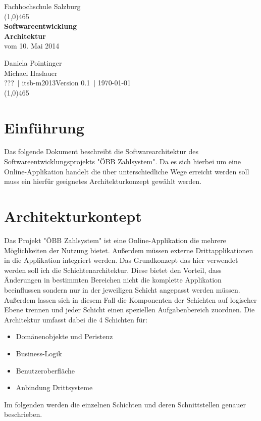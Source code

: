 \documentclass[a4paper,12pt]{article} %
\author{\theauthor\\\company}
\date{\thedate}
\title{\thetitle}
\def \theauthor  {Daniela Pointinger\\Michael Haslauer\\???}
\def \thedate    {\today}
\def \thetitle   {Softwareentwicklung\\Architektur}
\def \subtitle   {vom 10. Mai 2014}
\def \company    {Fachhochschule Salzburg}
\def \department {itsb-m2013}
\def \version    {0.1}
\begin{document}
\begin{titlepage}
\begin{center}
\Large\company\tiny\\
\textcolor{titlepagelinecolor}{\line(1,0){465}\\[1cm]}
\huge
\textbf{\thetitle}\\
\Large \subtitle\\[1cm]
\end{center}
\large
\theauthor\ $\mid$ \department\hfill Version \version\ $\mid$ \thedate\\[1cm]
\textcolor{titlepagelinecolor}{\line(1,0){465}\\[1cm]}
\end{titlepage}

\tableofcontents %

\newpage


\section{Einführung}
Das folgende Dokument beschreibt die Softwarearchitektur des Softwareentwicklungsprojekts "ÖBB Zahlsystem". Da es sich hierbei um eine Online-Applikation handelt die über unterschiedliche Wege erreicht werden soll muss ein hierfür geeignetes Architekturkonzept gewählt werden.

\section{Architekturkontept}
Das Projekt "ÖBB Zahlsystem" ist eine Online-Applikation die mehrere Möglichkeiten der Nutzung bietet. Außerdem müssen externe Drittapplikationen in die Applikation integriert werden. Das Grundkonzept das hier verwendet werden soll ich die Schichtenarchitektur. Diese bietet den Vorteil, dass Änderungen in bestimmten Bereichen nicht die komplette Applikation beeinflussen sondern nur in der jeweiligen Schicht angepasst werden müssen. Außerdem lassen sich in diesem Fall die Komponenten der Schichten auf logischer Ebene trennen und jeder Schicht einen speziellen Aufgabenbereich zuordnen. Die Architektur umfasst dabei die 4 Schichten für:
\begin{itemize}\itemsep2pt
 \item Domänenobjekte und Peristenz
 \item Business-Logik
 \item Benutzeroberfläche
 \item Anbindung Drittsysteme
\end{itemize}
Im folgenden werden die einzelnen Schichten und deren Schnittstellen genauer beschrieben.
\end{document}
